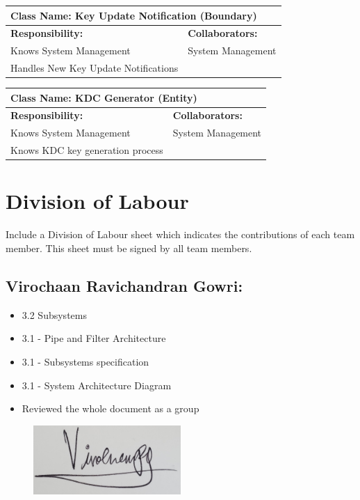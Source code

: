 \documentclass[]{article}
\begin{document}
\begin{table}[ht]
	\centering
	\begin{tabular}{|p{7cm}|p{7cm}|}
		\hline
		\multicolumn{2}{|l|}{\textbf{Class Name:} Key Update Notification (Boundary)}             \\
		\hline
		\textbf{Responsibility:}                             & \textbf{Collaborators:}  \\
		\hline
		Knows System Management	         			         & System Management         \\
		Handles New Key Update Notifications				 &						     \\


		\hline
	\end{tabular}
\end{table}

\begin{table}[ht]
	\centering
	\begin{tabular}{|p{7cm}|p{7cm}|}
		\hline
		\multicolumn{2}{|l|}{\textbf{Class Name:} KDC Generator (Entity)}             \\
		\hline
		\textbf{Responsibility:}                             & \textbf{Collaborators:}  \\
		\hline
		Knows System Management	         			         & System Management         \\
		Knows KDC key generation process      				 &						     \\


		\hline
	\end{tabular}
\end{table}

\clearpage
\newpage
\appendix
\section{Division of Labour}
\label{sec:division_of_labour}
Include a Division of Labour sheet which indicates the contributions of each team member. This sheet must be signed by all team members.
\subsection*{Virochaan Ravichandran Gowri:}
\begin{itemize}
	\item 3.2 Subsystems
	\item 3.1 - Pipe and Filter Architecture
	\item 3.1 - Subsystems specification
	\item 3.1 - System Architecture Diagram
	\item Reviewed the whole document as a group
\end{itemize}
\begin{figure}[h]
	\centering
	\includegraphics[width=0.5\textwidth]{ViroSignature.jpg}
	\label{fig:signature}
\end{figure}
\end{document}
